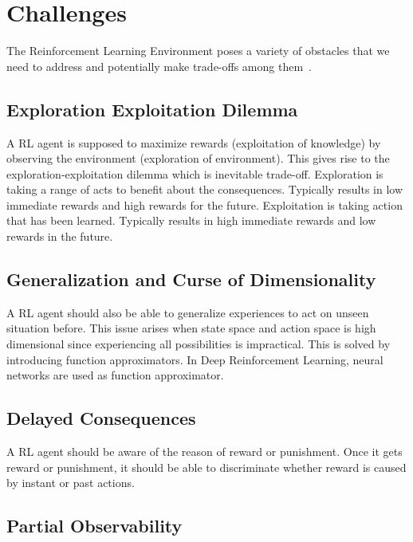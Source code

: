 \section{Challenges}
\label{sec:chal}

The Reinforcement Learning Environment poses a variety of obstacles 
that we need to address and potentially make trade-offs among them~\cite{dulac-arnold_challenges_2019, sutton_reinforcement_1998}.

\subsection{Exploration Exploitation Dilemma}

A RL agent is supposed to maximize rewards (exploitation of knowledge) by observing the environment (exploration of environment). 
This gives rise to the exploration-exploitation dilemma which is inevitable trade-off. 
Exploration is taking a range of acts to benefit about the consequences. 
Typically results in low immediate rewards and high rewards for the future. 
Exploitation is taking action that has been learned. Typically results in high immediate rewards and low rewards in the future. 

\subsection{Generalization and Curse of Dimensionality}

A RL agent should also be able to generalize experiences to act on unseen situation before. 
This issue arises when state space and action space is high dimensional since experiencing all possibilities is impractical. 
This is solved by introducing function approximators. In Deep Reinforcement Learning, neural networks are used as function approximator. 

\subsection{Delayed Consequences}

A RL agent should be aware of the reason of reward or punishment. 
Once it gets reward or punishment, it should be able to discriminate whether reward is caused by instant or past actions. 

\subsection{Partial Observability}

